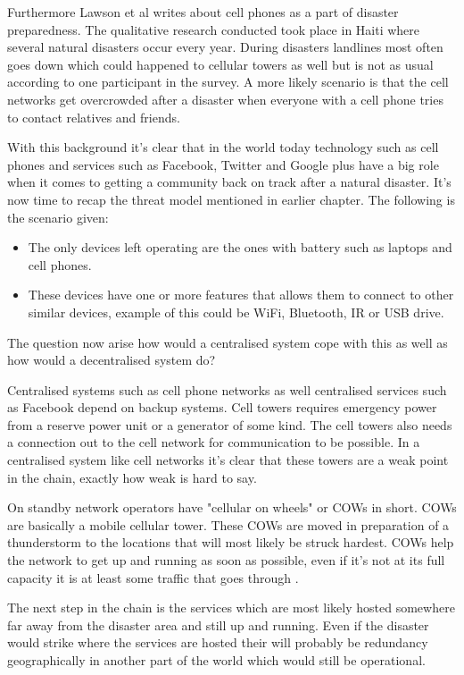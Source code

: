 Furthermore Lawson et al \cite{lawson2012} writes about cell phones as a part of disaster preparedness.
The qualitative research conducted took place in Haiti where several natural disasters occur every year.
During disasters landlines most often goes down which could happened to cellular towers as well but is not as usual according to one participant in the survey.
A more likely scenario is that the cell networks get overcrowded after a disaster when everyone with a cell phone tries to contact relatives and friends.

With this background it's clear that in the world today technology such as cell phones and services such as Facebook, Twitter and Google plus have a big role when it comes to getting a community back on track after a natural disaster.
It's now time to recap the threat model mentioned in earlier chapter.
The following is the scenario given:
\begin{itemize}
  \item The only devices left operating are the ones with battery such as laptops and cell phones.
  \item These devices have one or more features that allows them to connect to other similar devices, example of this could be WiFi, Bluetooth, IR or USB drive.
\end{itemize}
The question now arise how would a centralised system cope with this as well as how would a decentralised system do?

Centralised systems such as cell phone networks as well centralised services such as Facebook depend on backup systems.
Cell towers requires emergency power from a reserve power unit or a generator of some kind.
The cell towers also needs a connection out to the cell network for communication to be possible.
In a centralised system like cell networks it's clear that these towers are a weak point in the chain, exactly how weak is hard to say.

On standby network operators have "cellular on wheels" or COWs in short.
COWs are basically a mobile cellular tower.
These COWs are moved in preparation of a thunderstorm to the locations that will most likely be struck hardest.
COWs help the network to get up and running as soon as possible, even if it's not at its full capacity it is at least some traffic that goes through \cite{swartz1999}.

The next step in the chain is the services which are most likely hosted somewhere far away from the disaster area and still up and running.
Even if the disaster would strike where the services are hosted their will probably be redundancy geographically in another part of the world which would still be operational.

